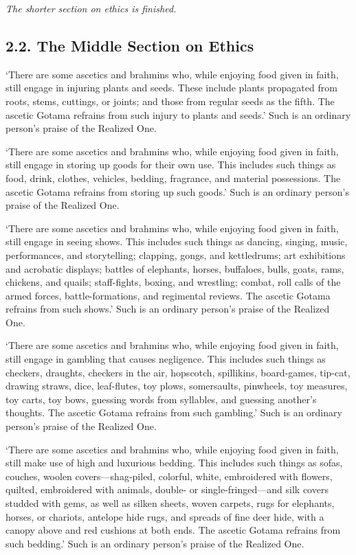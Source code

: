 \documentclass[12pt,openany]{book}%
\newcommand*{\scendsection}[1]{\begin{center}\textit{#1}\end{center}}
\begin{document}
\scendsection{The shorter section on ethics is finished. }

\subsection*{2.2. The Middle Section on Ethics }

‘There are some ascetics and brahmins who, while enjoying food given in faith, still engage in injuring plants and seeds. These include plants propagated from roots, stems, cuttings, or joints; and those from regular seeds as the fifth. The ascetic Gotama refrains from such injury to plants and seeds.’ Such is an ordinary person’s praise of the Realized One. 

‘There are some ascetics and brahmins who, while enjoying food given in faith, still engage in storing up goods for their own use. This includes such things as food, drink, clothes, vehicles, bedding, fragrance, and material possessions. The ascetic Gotama refrains from storing up such goods.’ Such is an ordinary person’s praise of the Realized One. 

‘There are some ascetics and brahmins who, while enjoying food given in faith, still engage in seeing shows. This includes such things as dancing, singing, music, performances, and storytelling; clapping, gongs, and kettledrums; art exhibitions and acrobatic displays; battles of elephants, horses, buffaloes, bulls, goats, rams, chickens, and quails; staff-fights, boxing, and wrestling; combat, roll calls of the armed forces, battle-formations, and regimental reviews. The ascetic Gotama refrains from such shows.’ Such is an ordinary person’s praise of the Realized One. 

‘There are some ascetics and brahmins who, while enjoying food given in faith, still engage in gambling that causes negligence. This includes such things as checkers, draughts, checkers in the air, hopscotch, spillikins, board-games, tip-cat, drawing straws, dice, leaf-flutes, toy plows, somersaults, pinwheels, toy measures, toy carts, toy bows, guessing words from syllables, and guessing another’s thoughts. The ascetic Gotama refrains from such gambling.’ Such is an ordinary person’s praise of the Realized One. 

‘There are some ascetics and brahmins who, while enjoying food given in faith, still make use of high and luxurious bedding. This includes such things as sofas, couches, woolen covers—shag-piled, colorful, white, embroidered with flowers, quilted, embroidered with animals, double- or single-fringed—and silk covers studded with gems, as well as silken sheets, woven carpets, rugs for elephants, horses, or chariots, antelope hide rugs, and spreads of fine deer hide, with a canopy above and red cushions at both ends. The ascetic Gotama refrains from such bedding.’ Such is an ordinary person’s praise of the Realized One. 
\end{document}
